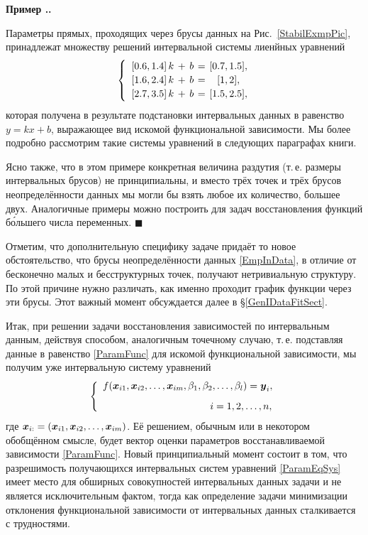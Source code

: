 \documentclass[a5paper,openany]{book}
\newcommand{\mbf}[1]{\protect\text{\boldmath$#1$}}
\newcounter{ExmpNum}[section]
\renewcommand{\theExmpNum}{\thesection.\arabic{ExmpNum}}
\newenvironment{example}%
  {\refstepcounter{ExmpNum}%
  \par\addvspace{\medskipamount} 
  \noindent\textbf{Пример {\theExmpNum}.}
  }%
  {\hfill$\blacksquare$\par\medskip}
\begin{document}
\begin{example}
Параметры прямых, проходящих через брусы данных на Рис.~\ref{StabilExmpPic}, 
принадлежат множеству решений интервальной системы лиенйных уравнений  
\begin{equation*} 
\arraycolsep=2pt 
\left\{ \ 
\begin{array}{ccccc}
[0.6, 1.4]\,k &+& b &=& [0.7, 1.5], \\[2pt] 
[1.6, 2.4]\,k &+& b &=&   [1, 2],   \\[2pt] 
[2.7, 3.5]\,k &+& b &=& [1.5, 2.5], 
\end{array} 
\right. 
\end{equation*} 
которая получена в результате подстановки интервальных данных в равенство 
$y = kx + b$, выражающее вид искомой функциональной зависимости. Мы более подробно 
рассмотрим такие системы уравнений в следующих параграфах книги. 
  
Ясно также, что в этом примере конкретная величина раздутия (т.\,е. размеры 
интервальных брусов) не принципиальны, и вместо трёх точек и трёх брусов 
неопределённости данных мы могли бы взять любое их количество, большее двух. 
Аналогичные примеры можно построить для задач восстановления функций б\'{о}льшего 
числа переменных.  
\end{example} 
  
Отметим, что дополнительную специфику задаче придаёт то новое обстоятельство, что 
брусы неопределённости данных \eqref{EmpInData}, в отличие от бесконечно малых и 
бесструктурных точек, получают нетривиальную структуру. По этой причине нужно 
различать, как именно проходит график функции через эти брусы. Этот важный момент 
обсуждается далее в \S\ref{GenIDataFitSect}. 
  
Итак, при решении задачи восстановления зависимостей по интервальным данным, 
действуя способом, аналогичным точечному случаю, т.\,е. подставляя данные в равенство 
\eqref{ParamFunc} для искомой функциональной зависимости, мы получим уже интервальную 
систему уравнений 
\begin{equation} 
\label{ParamEqSys} 
\left\{ 
\begin{array}{l} 
f(\mbf{x}_{i1}, \mbf{x}_{i2}, \ldots, \mbf{x}_{im}, 
   \beta_{1}, \beta_{2}, \ldots, \beta_{l}) = \mbf{y}_{i}, \\[3mm] 
\hspace*{38mm} i = 1,2,\ldots,n, 
\end{array} 
\right. 
\end{equation} 
где $\mbf{x}_{i:} = (\mbf{x}_{i1}, \mbf{x}_{i2}, \ldots, \mbf{x}_{im})$. 
Её решением, обычным или в некотором обобщённом смысле, будет вектор оценки параметров 
восстанавливаемой зависимости \eqref{ParamFunc}. Новый принципиальный момент состоит 
в том, что разрешимость получающихся интервальных систем уравнений \eqref{ParamEqSys} 
имеет место для обширных совокупностей интервальных данных задачи и не является 
исключительным фактом, тогда как определение задачи минимизации отклонения 
функциональной зависимости от интервальных данных сталкивается с трудностями. 
  
\end{document}
